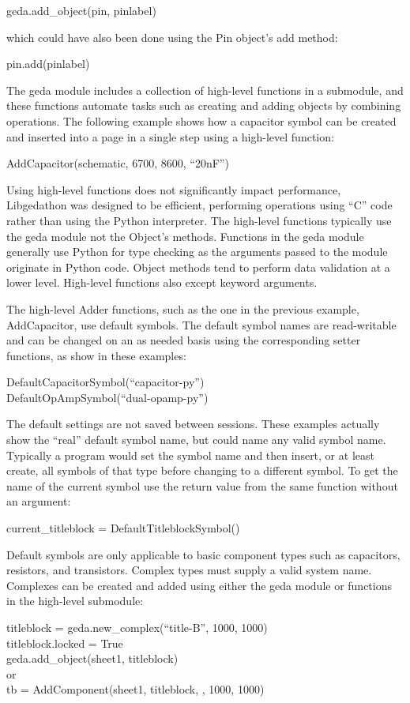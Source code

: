 geda.add\_object(pin, pinlabel)

  which could have also been done using the Pin object's add method:

pin.add(pinlabel)


  The geda module includes a collection of high-level functions in a submodule, and these functions automate tasks such as creating and adding objects by combining operations. The following example shows how a capacitor symbol can be created and inserted into a page in a single step using a high-level function:

AddCapacitor(schematic, 6700, 8600, ``20nF'')


  Using high-level functions does not significantly impact performance, Libgedathon was designed to be efficient, performing operations using ``C'' code rather than using the Python interpreter. The high-level functions typically use the geda module not the Object's methods. Functions in the geda module generally use Python for type checking as the arguments passed to the module originate in Python code. Object methods tend to perform data validation at a lower level. High-level functions also except keyword arguments.


  The high-level Adder functions, such as the one in the previous example, AddCapacitor, use default symbols. The default symbol names are read-writable and can be changed on an as needed basis using the corresponding setter functions, as show in these examples:

DefaultCapacitorSymbol(``capacitor-py'')
\\ 
DefaultOpAmpSymbol(``dual-opamp-py'')


  The default settings are not saved between sessions. These examples actually show the ``real'' default symbol name, but could name any valid symbol name. Typically a program would set the symbol name and then insert, or at least create, all symbols of that type before changing to a different symbol. To get the name of the current symbol use the return value from the same function without an argument:

current\_titleblock = DefaultTitleblockSymbol()


  Default symbols are only applicable to basic component types such as capacitors, resistors, and transistors. Complex types must supply a valid system name. Complexes can be created and added using either the geda module or functions in the high-level submodule:

titleblock = geda.new\_complex(``title-B'', 1000, 1000)\\ 
 titleblock.locked = True\\ 
 geda.add\_object(sheet1, titleblock)\\ 
 or\\ 
tb = AddComponent(sheet1, titleblock, , 1000, 1000)


